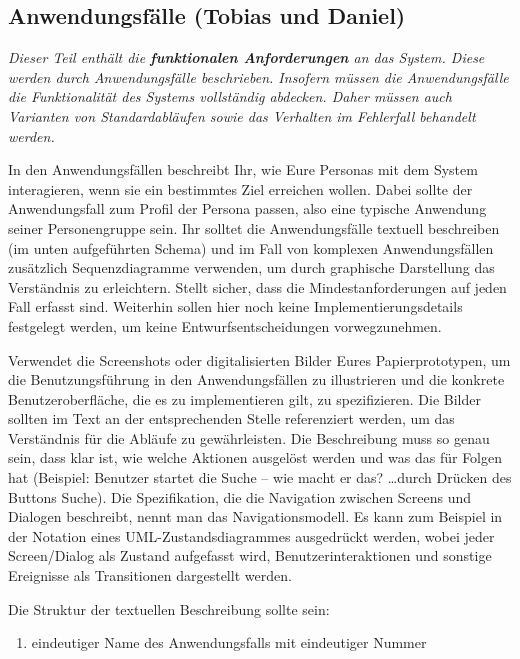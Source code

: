 \documentclass[fontsize=12pt,paper=a4,twoside]{scrartcl}
\begin{document}
\subsection{Anwendungsfälle (Tobias und Daniel)}
  {\em Dieser Teil enthält die \textbf{funktionalen Anforderungen} an
  das System. Diese werden durch Anwendungsfälle beschrieben. Insofern
  müssen die Anwendungsfälle die Funktionalität des Systems
  vollständig abdecken. Daher müssen auch Varianten von
  Standard\-ab\-läufen sowie das Verhalten im Fehlerfall behandelt werden.
  
  In den Anwendungsfällen beschreibt Ihr, wie Eure Personas mit dem
  System interagieren, wenn sie ein bestimmtes Ziel erreichen wollen.
  Dabei sollte der Anwendungsfall zum Profil der Persona passen, also
  eine typische Anwendung seiner Personengruppe sein. Ihr solltet die
  Anwendungsfälle textuell beschreiben (im unten aufgeführten Schema)
  und im Fall von komplexen Anwendungsfällen zusätzlich
  Sequenzdiagramme verwenden, um durch graphische Darstellung das
  Verständnis zu erleichtern.  Stellt sicher, dass die
  Mindestanforderungen auf jeden Fall erfasst sind.  Weiterhin sollen
  hier noch keine Implementierungsdetails festgelegt werden, um keine
  Entwurfsentscheidungen vorwegzunehmen.

  Verwendet die Screenshots oder digitalisierten Bilder Eures
  Papierprototypen, um die Benutzungsführung in den Anwendungsfällen
  zu illustrieren und die konkrete Benutzer\-oberfläche, die es zu
  implementieren gilt, zu spezifizieren. Die Bilder sollten im Text an
  der entsprechenden Stelle referenziert werden, um das Verständnis
  für die Abläufe zu gewährleisten. Die Beschreibung muss so genau
  sein, dass klar ist, wie welche Aktionen ausgelöst werden und was
  das für Folgen hat (Beispiel: {\glqq}Benutzer startet die
  Suche{\grqq} -- wie macht er das?  {\glqq}{\ldots}durch Drücken des
  Buttons {\glq}Suche{\grq}{\grqq}). Die Spezifikation, die die
  Navigation zwischen Screens und Dialogen beschreibt, nennt man
  das Navigationsmodell. Es kann zum Beispiel in der Notation eines   
  UML-Zustandsdiagrammes ausgedrückt werden, wobei jeder Screen/Dialog als
  Zustand aufgefasst wird, Benutzerinteraktionen und sonstige Ereignisse
  als Transitionen dargestellt werden.

  Die Struktur der textuellen Beschreibung sollte sein:
  \begin{enumerate}
    \item eindeutiger Name des Anwendungsfalls mit eindeutiger Nummer
    

\end{enumerate}}
\end{document}
